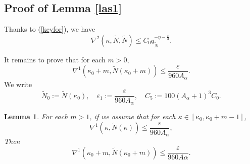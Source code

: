 \documentclass{amsart}
\newtheorem{Lemma}[Definition]{Lemma}
\theoremstyle{definition}
\begin{document}
\subsection{Proof of Lemma \ref{las1}}
Thanks to (\ref{keyfor}), we have
\[\nabla^2(\kappa,\tilde{N},\tilde{N})\leq C_0q_{\tilde{N}}^{-\eta-\frac{\varepsilon}{3}}.\]

It remains to prove that for each $m>0$,
\begin{equation}\label{Y1}
\nabla^1(\kappa_0+m,\tilde{N}(\kappa_0+m))\leq \frac{\varepsilon}{960A_\alpha}.
\end{equation}
We write \[\tilde{N}_0:=\tilde{N}(\kappa_0),\quad \varepsilon_1:=\frac{\varepsilon}{960A_\alpha},\quad C_5:=100(A_{\alpha}+1)^3C_0.\]
\begin{Lemma}\label{RND}
{For each $ m>1$, if we assume that  for each $\kappa \in [\kappa_0,\kappa_0+m-1]$,
	\[\nabla^1(\kappa,\tilde{N}(\kappa))\leq \frac{\varepsilon}{960A_\alpha},\]}
Then \[{\nabla^1(\kappa_0+m,\tilde{N}(\kappa_0+m))\leq \frac{\varepsilon}{960A\alpha}}.\]
\end{Lemma}
\end{document}
